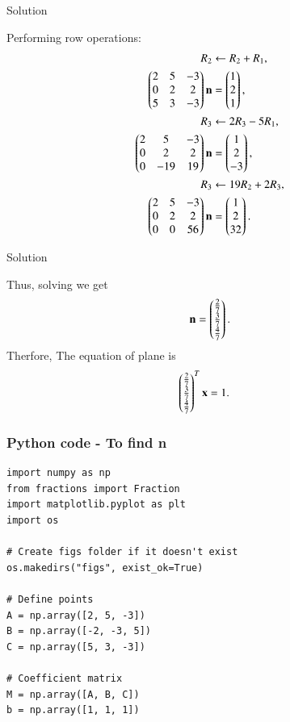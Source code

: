 \documentclass{beamer}
\begin{document}
\begin{frame}{Solution}

Performing row operations:
\begin{align}
R_2 &\leftarrow R_2 + R_1, \\
\begin{pmatrix}2 & 5 & -3 \\ 0 & 2 & 2 \\ 5 & 3 & -3\end{pmatrix}\mathbf{n}
&= \begin{pmatrix}1 \\ 2 \\ 1\end{pmatrix},\\
R_3 &\leftarrow 2R_3 - 5R_1, \\
\begin{pmatrix}2 & 5 & -3 \\ 0 & 2 & 2 \\ 0 & -19 & 19\end{pmatrix}\mathbf{n}
&= \begin{pmatrix}1 \\ 2 \\ -3\end{pmatrix},\\
R_3 &\leftarrow 19R_2 + 2R_3, \\
\begin{pmatrix}2 & 5 & -3 \\ 0 & 2 & 2 \\ 0 & 0 & 56\end{pmatrix}\mathbf{n}
&= \begin{pmatrix}1 \\ 2 \\ 32\end{pmatrix}.
\end{align}
\end{frame}
\begin{frame}{Solution}

Thus, solving we get
\begin{align}
\mathbf{n} = \begin{pmatrix}\tfrac{2}{7} \\ \tfrac{3}{7} \\ \tfrac{4}{7}\end{pmatrix}.
\end{align}
Therfore,
The equation of plane is
\begin{align}
	\begin{pmatrix}\tfrac{2}{7} \\ \tfrac{3}{7} \\ \tfrac{4}{7}\end{pmatrix}^T\mathbf{x} &= 1.
\end{align}
\end{frame}
\begin{frame}[fragile]                            
\frametitle{Python code - To find n }                
\begin{lstlisting}
import numpy as np
from fractions import Fraction
import matplotlib.pyplot as plt
import os

# Create figs folder if it doesn't exist
os.makedirs("figs", exist_ok=True)

# Define points
A = np.array([2, 5, -3])
B = np.array([-2, -3, 5])
C = np.array([5, 3, -3])

# Coefficient matrix
M = np.array([A, B, C])
b = np.array([1, 1, 1])
\end{lstlisting}
\end{frame}
\end{document}
